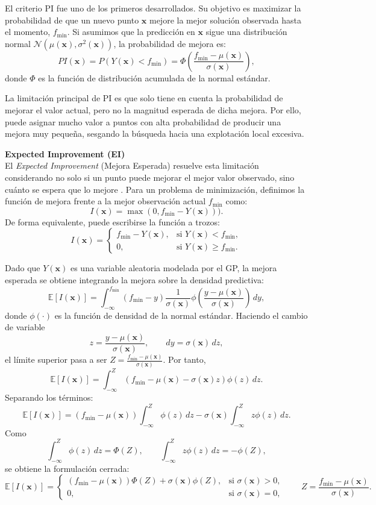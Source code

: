 El criterio PI fue uno de los primeros desarrollados. Su objetivo es maximizar la probabilidad
de que un nuevo punto \(\bm{x}\) mejore la mejor solución observada hasta el momento,
\(f_{\min}\). Si asumimos que la predicción en \(\bm{x}\) sigue una distribución normal
\(\mathcal{N}(\mu(\bm{x}), \sigma^2(\bm{x}))\), la probabilidad de mejora es:
\[
PI(\bm{x})
=
P(Y(\bm{x}) < f_{\min})
=
\Phi\left(
\frac{f_{\min}-\mu(\bm{x})}{\sigma(\bm{x})}
\right),
\]
donde \(\Phi\) es la función de distribución acumulada de la normal estándar.

La limitación principal de PI es que solo tiene en cuenta la probabilidad de mejorar el valor
actual, pero no la magnitud esperada de dicha mejora. Por ello, puede asignar mucho valor a
puntos con alta probabilidad de producir una mejora muy pequeña, sesgando la búsqueda
hacia una explotación local excesiva.

\vspace{0.3cm}
\noindent\textbf{Expected Improvement (EI)} \\

El \textit{Expected Improvement} (Mejora Esperada) resuelve esta limitación considerando
no solo si un punto puede mejorar el mejor valor observado, sino cuánto se espera que lo
mejore \cite{jones1998efficient}. Para un problema de minimización, definimos la función
de mejora frente a la mejor observación actual \(f_{\min}\) como:
\[
I(\bm{x})
=
\max(0, f_{\min}-Y(\bm{x}))).
\]
De forma equivalente, puede escribirse la función a trozos:
\[
I(\bm{x})
=
\begin{cases}
f_{\min}-Y(\bm{x}), & \text{si } Y(\bm{x})<f_{\min},\\
0, & \text{si } Y(\bm{x})\geq f_{\min}.
\end{cases}
\]

Dado que \(Y(\bm{x})\) es una variable aleatoria modelada por el GP, la mejora esperada se
obtiene integrando la mejora sobre la densidad predictiva:
\[
\mathbb{E}[I(\bm{x})]
=
\int_{-\infty}^{f_{\min}}
(f_{\min}-y)
\frac{1}{\sigma(\bm{x})}
\phi\left(
\frac{y-\mu(\bm{x})}{\sigma(\bm{x})}
\right)
\,dy,
\]
donde \(\phi(\cdot)\) es la función de densidad de la normal estándar. Haciendo el cambio
de variable
\[
z=\frac{y-\mu(\bm{x})}{\sigma(\bm{x})},
\qquad
dy=\sigma(\bm{x})\,dz,
\]
el límite superior pasa a ser
\(
Z=\frac{f_{\min}-\mu(\bm{x})}{\sigma(\bm{x})}.
\)
Por tanto,
\[
\mathbb{E}[I(\bm{x})]
=
\int_{-\infty}^{Z}
\left(f_{\min}-\mu(\bm{x})-\sigma(\bm{x})z\right)\phi(z)\,dz.
\]
Separando los términos:
\[
\mathbb{E}[I(\bm{x})]
=
(f_{\min}-\mu(\bm{x}))\int_{-\infty}^{Z}\phi(z)\,dz
-
\sigma(\bm{x})\int_{-\infty}^{Z}z\phi(z)\,dz.
\]
Como
\[
\int_{-\infty}^{Z}\phi(z)\,dz=\Phi(Z),
\qquad
\int_{-\infty}^{Z}z\phi(z)\,dz=-\phi(Z),
\]
se obtiene la formulación cerrada:
\begin{equation}
\label{eq:ei}
\mathbb{E}[I(\bm{x})] =
\begin{cases} 
(f_{\min} - \mu(\bm{x})) \Phi(Z) + \sigma(\bm{x}) \phi(Z),
& \text{si } \sigma(\bm{x}) > 0, \\[0.2em]
0,
& \text{si } \sigma(\bm{x}) = 0,
\end{cases}
\qquad
Z = \frac{f_{\min} - \mu(\bm{x})}{\sigma(\bm{x})}.
\end{equation}

